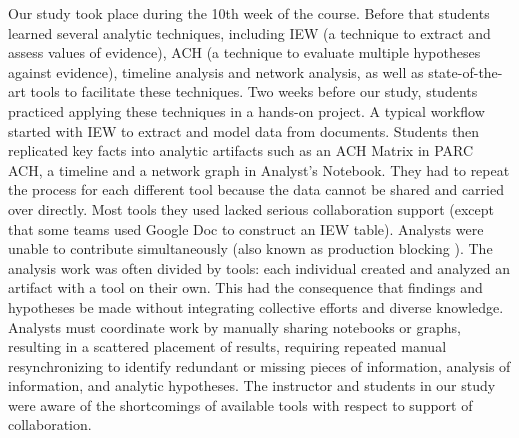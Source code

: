Our study took place during the 10th week of the course. Before that students learned several analytic techniques, including IEW (a
technique to extract and assess values of evidence), ACH (a technique to
evaluate multiple hypotheses against evidence), timeline analysis and
network analysis, as well as state-of-the-art tools to facilitate these
techniques. Two weeks before our study, students practiced applying
these techniques in a hands-on project. A typical workflow started with
IEW to extract and model data from documents. Students then replicated
key facts into analytic artifacts such as an ACH Matrix in PARC ACH, a
timeline and a network graph in Analyst's Notebook. They had to repeat
the process for each different tool because the data cannot be shared
and carried over directly. Most tools they used lacked serious
collaboration support (except that some teams used Google Doc to
construct an IEW table). Analysts were unable to contribute
simultaneously (also known as production blocking \autocite{Diehl1987a}). The analysis work
was often divided by tools: each individual created and analyzed an
artifact with a tool on their own. This had the consequence that
findings and hypotheses be made without integrating collective efforts
and diverse knowledge. Analysts must coordinate work by manually sharing
notebooks or graphs, resulting in a scattered placement of results,
requiring repeated manual resynchronizing to identify redundant or
missing pieces of information, analysis of information, and analytic
hypotheses. The instructor and students in our study were aware of the
shortcomings of available tools with respect to support of
collaboration.